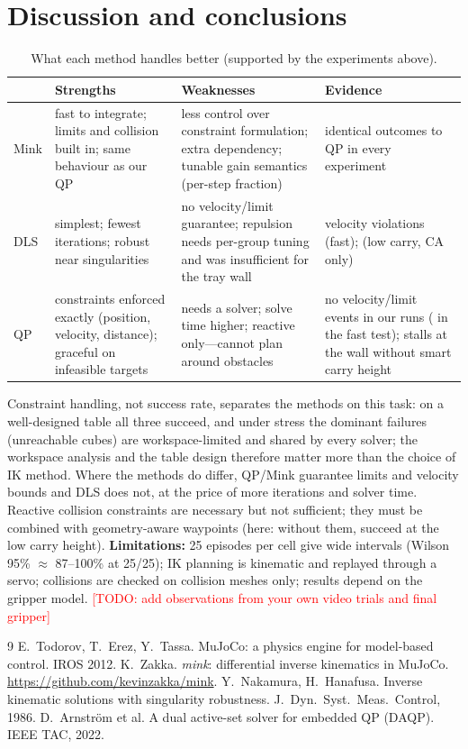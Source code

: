 \documentclass[10pt,a4paper]{article}
\newcommand{\todo}[1]{\textcolor{red}{[TODO: #1]}}
\begin{document}
\section{Discussion and conclusions}
\begin{table}[!t]\centering\small\caption{What each method handles better (supported by the experiments above).}\label{tab:disc}
\begin{tabular}{p{1.9cm}p{4.7cm}p{4.6cm}p{4.6cm}}\toprule
 & Strengths & Weaknesses & Evidence\\\midrule
Mink & fast to integrate; limits and collision built in; same behaviour as our QP & less control over constraint formulation; extra dependency; tunable gain semantics (per-step fraction) & identical outcomes to QP in every experiment\\
DLS & simplest; fewest iterations; robust near singularities & no velocity/limit guarantee; repulsion needs per-group tuning and was insufficient for the tray wall & \fastVelDLS{} velocity violations (fast); \lcCASuccDLS{} (low carry, CA only)\\
QP & constraints enforced exactly (position, velocity, distance); graceful on infeasible targets & needs a solver; solve time higher; reactive only---cannot plan around obstacles & no velocity/limit events in our runs (\fastVelQP{} in the fast test); stalls at the wall without smart carry height\\\bottomrule
\end{tabular}\end{table}
Constraint handling, not success rate, separates the methods on this task: on a well-designed table all three succeed, and under stress the dominant failures (unreachable cubes) are
workspace-limited and shared by every solver; the workspace analysis and the table design therefore matter more than the choice of IK method. Where the methods do differ, QP/Mink guarantee
limits and velocity bounds and DLS does not, at the price of more iterations and solver time. Reactive collision constraints are necessary  but not sufficient;
they must be combined with geometry-aware waypoints (here: without them, \lcNoCASuccMink{} succeed at the low carry height). \textbf{Limitations:} 25 episodes per cell give wide intervals (Wilson 95\% ${\approx}$ 87--100\% at 25/25); IK planning is kinematic
and replayed through a servo; collisions are checked on collision meshes only; results depend on the gripper model. \todo{add observations from your own video trials and final gripper}

\begin{thebibliography}{9}\small
{} E.~Todorov, T.~Erez, Y.~Tassa. MuJoCo: a physics engine for model-based control. IROS 2012.
 K.~Zakka. \emph{mink}: differential inverse kinematics in MuJoCo. \url{https://github.com/kevinzakka/mink}.
 Y.~Nakamura, H.~Hanafusa. Inverse kinematic solutions with singularity robustness. J.~Dyn.\ Syst.\ Meas.\ Control, 1986.
 D.~Arnström et al. A dual active-set solver for embedded QP (DAQP). IEEE TAC, 2022.
\end{thebibliography}
\end{document}
